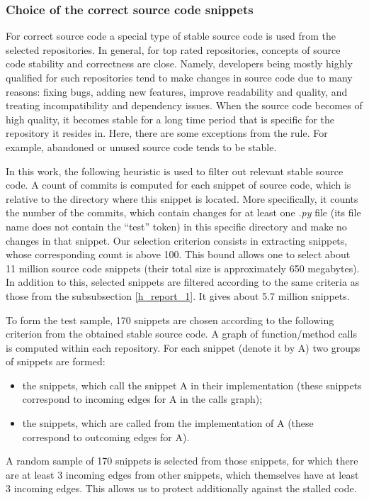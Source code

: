 \documentclass[10pt,conference]{IEEEtran}
\begin{document}
\subsubsection{Choice of the correct source code snippets}

For correct source code a special type of stable source code is used from the selected repositories.
In general, for top rated repositories, concepts of source code stability and correctness are close.
Namely, developers being mostly highly qualified for such repositories tend to make changes in source code due to many reasons: fixing bugs, adding new features, improve readability and quality, and
treating incompatibility and dependency issues. When the source code becomes of high quality, it becomes stable for a long time period that is specific for
the repository it resides in. Here, there are some exceptions from the rule. For example, abandoned or unused source code tends to be stable.

In this work, the following heuristic is used to filter out relevant stable source code. A count of commits is computed for each snippet of source code,
which is relative to the directory where this snippet is located. More specifically, it counts the number of the commits, which contain changes for at least one \textit{.py} file (its file name does not contain the ``test'' token) in this specific
directory and make no changes in that snippet. Our selection criterion consists in extracting snippets, whose corresponding count is above 100.
This bound allows one to select about 11 million source code snippets (their total size is approximately 650 megabytes).
In addition to this, selected snippets are filtered according to the same criteria as those from the subsubsection \ref{h_report_1}. It gives about 5.7 million snippets.

To form the test sample, 170 snippets are chosen according to the following criterion from the obtained stable source code. A graph of function/method calls is computed within each repository.
For each snippet (denote it by A) two groups of snippets are formed: 
\begin{itemize}
\item the snippets, which call the snippet A in their implementation (these snippets correspond to incoming edges for A in the calls graph);

\item the snippets, which are called from the implementation of A (these correspond to outcoming edges for A).
\end{itemize}
A random sample of 170 snippets is selected from those snippets, for which there are at least 3 incoming edges from other snippets, which themselves have at least 3 incoming edges.
This allows us to protect additionally against the stalled code.
\end{document}
